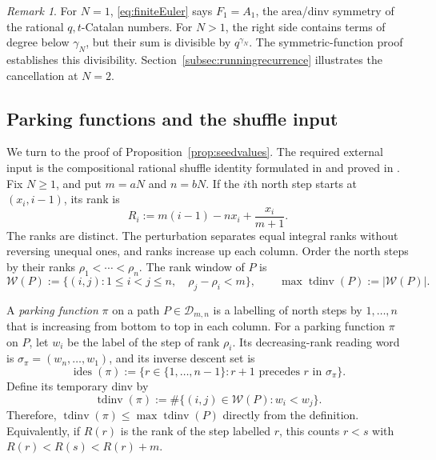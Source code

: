 \documentclass[12pt,reqno]{amsart}
\numberwithin{equation}{section}
\theoremstyle{definition}
\theoremstyle{remark}
\newtheorem*{remark}{Remark}
\theoremstyle{plain}
\DeclareMathOperator{\tdinv}{tdinv}
\DeclareMathOperator{\ides}{ides}
\begin{document}
\begin{remark}
For $N=1$, \eqref{eq:finiteEuler} says $F_1=A_1$, the area/dinv symmetry of the rational $q,t$-Catalan numbers. For $N>1$, the right side contains terms of degree below $\gamma_N$, but their sum is divisible by $q^{\gamma_N}$. The symmetric-function proof establishes this divisibility.
 Section~\ref{subsec:runningrecurrence} illustrates the cancellation at $N=2$.
\end{remark}


\subsection{Parking functions and the shuffle input}\label{subsec:parking}
We turn to the proof of Proposition~\ref{prop:seedvalues}.
The required external input is the compositional rational shuffle
identity formulated in \cite[(3.7)]{BGLX} and proved in
\cite[Section~6]{Mellit}.
Fix $N\ge1$, and put $m=aN$ and $n=bN$.
  If the $i$th north step starts at $(x_i,i-1)$, its rank is
\begin{equation}\label{eq:PFrank}
 R_i:=m(i-1)-nx_i+\frac{x_i}{m+1}.
\end{equation}
The ranks are distinct.  The perturbation separates equal integral ranks
without reversing unequal ones, and ranks increase up each column.
Order the north steps by their ranks
$\rho_1<\cdots<\rho_n$.  The rank window of $P$ is
\begin{equation}\label{eq:rankwindow}
 \mathcal W(P):=\{(i,j):1\le i<j\le n,\quad \rho_j-\rho_i<m\},
 \qquad \max\tdinv(P):=|\mathcal W(P)|.
\end{equation}


A {\it parking function} $\pi$ on a path $P\in\mathcal D_{m,n}$ is a labelling of north steps by $1,\ldots,n$ that is increasing from bottom to top in each column. For a parking function $\pi$ on $P$, let $w_i$ be the label of the step
of rank $\rho_i$.  Its decreasing-rank reading word is
$\sigma_\pi=(w_n,\ldots,w_1)$, and its inverse descent set is
\[
 \ides(\pi):=\{r\in\{1,\ldots,n-1\}:r+1\text{ precedes }r
                   \text{ in }\sigma_\pi\}.
\]
Define its temporary dinv by
\begin{equation}\label{eq:tdinvwindow}
 \tdinv(\pi):=\#\{(i,j)\in\mathcal W(P):w_i<w_j\}.
\end{equation}
Therefore, $\tdinv(\pi)\le\max\tdinv(P)$ directly from the definition.
Equivalently, if $R(r)$ is the rank of the step labelled $r$, this counts
$r<s$ with $R(r)<R(s)<R(r)+m$.
\end{document}
